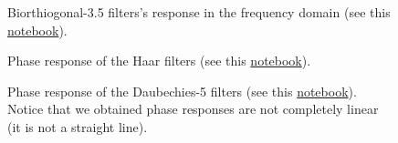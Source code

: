 \begin{figure}
  \centering
  \caption{Biorthiogonal-3.5 filters's response in the frequency
    domain (see this
    \href{https://github.com/Sistemas-Multimedia/Sistemas-Multimedia.github.io/blob/master/study_guide/05-DWT/dwt_filters_analysis.ipynb}{notebook}).}
  \label{fig:bior3.5_modulus}
\end{figure}

\begin{figure}
  \centering
  \caption{Phase response of the Haar filters (see this
    \href{https://github.com/Sistemas-Multimedia/Sistemas-Multimedia.github.io/blob/master/study_guide/05-DWT/dwt_filters_analysis.ipynb}{notebook}).}
  \label{fig:haar_phase}
\end{figure}

\begin{figure}
  \centering {}
  \caption{Phase response of the Daubechies-5 filters (see this
    \href{https://github.com/Sistemas-Multimedia/Sistemas-Multimedia.github.io/blob/master/study_guide/05-DWT/dwt_filters_analysis.ipynb}{notebook}). Notice
    that we obtained phase responses are not completely linear (it is
    not a straight line).}
  \label{fig:db5_phase}
\end{figure}

